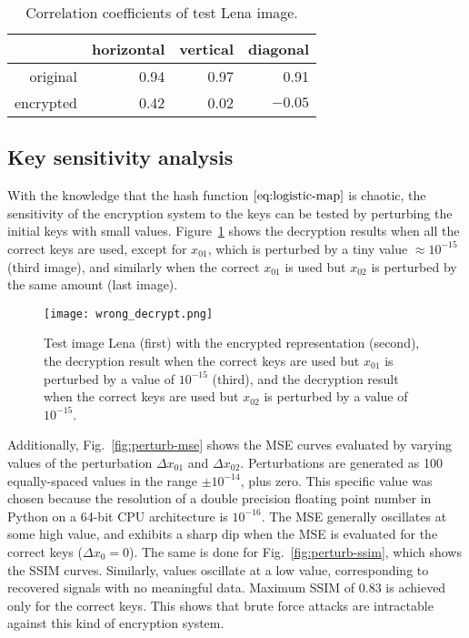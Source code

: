 \begin{table}
	\centering
	\caption{Correlation coefficients of test Lena image.}
	\label{tab:correlation}
	\begin{tabular}{rrrr}
		\toprule
		 & horizontal & vertical & diagonal \\
		 \midrule
		 original & 0.94 & 0.97 & 0.91 \\
		 encrypted & 0.42 & 0.02 & $-0.05$ \\
		 \bottomrule
	\end{tabular}
\end{table}


\subsection{Key sensitivity analysis}
\label{ssec:image-encrypt-keysensitivity}
With the knowledge that the hash function $\eqref{eq:logistic-map}$ is chaotic, the sensitivity of the encryption system to the keys can be tested by perturbing the initial keys with small values. Figure~\ref{fig:wrong-decryption} shows the decryption results when all the correct keys are used, except for $x_{01}$, which is perturbed by a tiny value $\approx 10^{-15}$ (third image), and similarly when the correct $x_{01}$ is used but $x_{02}$ is perturbed by the same amount (last image).

\begin{figure}[htb]
	\texttt{[image: wrong\_decrypt.png]}
	\caption{Test image Lena (first) with the encrypted representation (second), the decryption result when the correct keys are used but $x_{01}$ is perturbed by a value of $10^{-15}$ (third), and the decryption result when the correct keys are used but $x_{02}$ is perturbed by a value of $10^{-15}$.}
	\label{fig:wrong-decryption}
\end{figure}

Additionally, Fig.~\ref{fig:perturb-mse} shows the MSE curves evaluated by varying values of the perturbation $\Delta x_{01}$ and $\Delta x_{02}$. Perturbations are generated as 100 equally-spaced values in the range $\pm 10^{-14}$, plus zero. This specific value was chosen because the resolution of a double precision floating point number in Python on a 64-bit CPU architecture is $10^{-16}$. The MSE generally oscillates at some high value, and exhibits a sharp dip when the MSE is evaluated for the correct keys ($\Delta x_0 = 0$). The same is done for Fig.~\ref{fig:perturb-ssim}, which shows the SSIM curves. Similarly, values oscillate at a low value, corresponding to recovered signals with no meaningful data. Maximum SSIM of 0.83 is achieved only for the correct keys. This shows that brute force attacks are intractable against this kind of encryption system.


